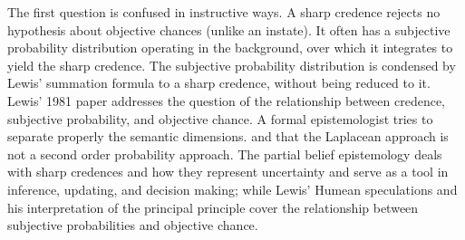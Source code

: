 The first question is confused in instructive ways. A sharp credence
rejects no hypothesis about objective chances (unlike an instate). It
often has a subjective probability distribution operating in the
background, over which it integrates to yield the sharp credence. The
subjective probability distribution is condensed by Lewis' summation
formula to a sharp credence, without being reduced to it. Lewis' 1981
paper  addresses the
question of the relationship between credence, subjective probability,
and objective chance. A formal epistemologist tries to separate
properly the semantic dimensions. and that the Laplacean approach is
not a second order probability approach. The partial belief
epistemology deals with sharp credences and how they represent
uncertainty and serve as a tool in inference, updating, and decision
making; while Lewis' Humean speculations and his interpretation of the
principal principle cover the relationship between subjective
probabilities and objective chance.
